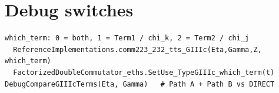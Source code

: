 \documentclass[11pt]{article}
\begin{document}
\section{Debug switches}

\begin{verbatim}
which_term: 0 = both, 1 = Term1 / chi_k, 2 = Term2 / chi_j
  ReferenceImplementations.comm223_232_tts_GIIIc(Eta,Gamma,Z, which_term)
  FactorizedDoubleCommutator_eths.SetUse_TypeGIIIc_which_term(t)
DebugCompareGIIIcTerms(Eta, Gamma)   # Path A + Path B vs DIRECT
\end{verbatim}
\end{document}

